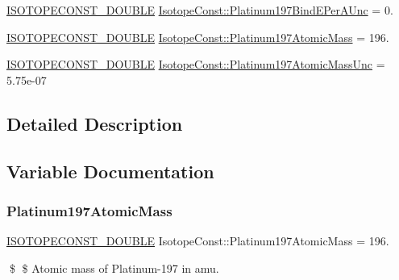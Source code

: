 \begin{DoxyCompactItemize}
\mbox{\hyperlink{group___isotope_const-_macros_ga8f45a7272ce02c0b4c65c44636ed719a}{I\+S\+O\+T\+O\+P\+E\+C\+O\+N\+S\+T\+\_\+\+D\+O\+U\+B\+LE}} \mbox{\hyperlink{group___isotope_const-_platinum-_pt197_ga8561afd1865861fefe3e240205251b74}{Isotope\+Const\+::\+Platinum197\+Bind\+E\+Per\+A\+Unc}} = 0.
\item 
\mbox{\hyperlink{group___isotope_const-_macros_ga8f45a7272ce02c0b4c65c44636ed719a}{I\+S\+O\+T\+O\+P\+E\+C\+O\+N\+S\+T\+\_\+\+D\+O\+U\+B\+LE}} \mbox{\hyperlink{group___isotope_const-_platinum-_pt197_gae33babeb01e656b9d0c2611e8a91ad36}{Isotope\+Const\+::\+Platinum197\+Atomic\+Mass}} = 196.
\item 
\mbox{\hyperlink{group___isotope_const-_macros_ga8f45a7272ce02c0b4c65c44636ed719a}{I\+S\+O\+T\+O\+P\+E\+C\+O\+N\+S\+T\+\_\+\+D\+O\+U\+B\+LE}} \mbox{\hyperlink{group___isotope_const-_platinum-_pt197_ga95ddcc272f5a2e185fe8923bf551f0ec}{Isotope\+Const\+::\+Platinum197\+Atomic\+Mass\+Unc}} = 5.\+75e-\/07
\end{DoxyCompactItemize}


\subsection{Detailed Description}


\subsection{Variable Documentation}
\mbox{\label{group___isotope_const-_platinum-_pt197_gae33babeb01e656b9d0c2611e8a91ad36}} 
\subsubsection{\texorpdfstring{Platinum197\+Atomic\+Mass}{Platinum197AtomicMass}}
{\footnotesize\ttfamily \mbox{\hyperlink{group___isotope_const-_macros_ga8f45a7272ce02c0b4c65c44636ed719a}{I\+S\+O\+T\+O\+P\+E\+C\+O\+N\+S\+T\+\_\+\+D\+O\+U\+B\+LE}} Isotope\+Const\+::\+Platinum197\+Atomic\+Mass = 196.}

\$ \$ Atomic mass of Platinum-\/197 in amu. \mbox{\label{group___isotope_const-_platinum-_pt197_ga95ddcc272f5a2e185fe8923bf551f0ec}} 
